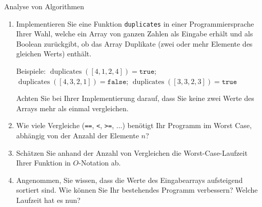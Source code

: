 \documentclass[11pt,a4paper]{article}
\begin{document}
\begin{aufgabe}{2}{Analyse von Algorithmen}
\begin{enumerate}
\item
Implementieren Sie eine Funktion \texttt{duplicates} in einer Programmiersprache Ihrer Wahl, welche ein Array von ganzen Zahlen als Eingabe erhält und als Boolean zurückgibt, ob das Array Duplikate (zwei oder mehr Elemente des gleichen Werts) enthält.

Beispiele: $\operatorname{duplicates}(\left[4, 1, 2, 4\right]) = \texttt{true}$;  $\operatorname{duplicates}(\left[4, 3, 2, 1\right]) = \texttt{false}$; $\operatorname{duplicates}(\left[3, 3, 2, 3\right]) = \texttt{true}$

Achten Sie bei Ihrer Implementierung darauf, dass Sie keine zwei Werte des Arrays mehr als einmal vergleichen.

\item
Wie viele Vergleiche (\texttt{==}, \texttt{<}, \texttt{>=}, $\ldots$) benötigt Ihr Programm im Worst Case, abhängig von der Anzahl der Elemente $n$?

\item Schätzen Sie anhand der Anzahl von Vergleichen die Worst-Case-Laufzeit Ihrer Funktion in $O$-Notation ab.
\item Angenommen, Sie wissen, dass die Werte des Eingabearrays aufsteigend sortiert sind.
Wie können Sie Ihr bestehendes Programm verbessern? Welche Laufzeit hat es nun?

\end{enumerate}
\end{aufgabe}
\end{document}
